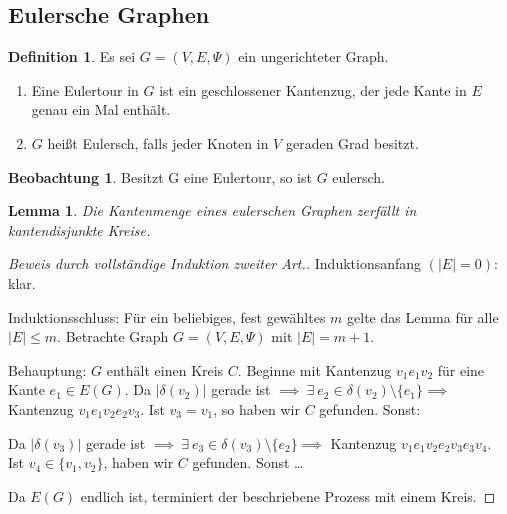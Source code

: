 \documentclass[a4paper,12pt]{article}
\newtheorem{lemma}[axiom]{Lemma}
\theoremstyle{definition}
\newtheorem*{beobachtung}{Beobachtung}
\newtheorem{definition}[axiom]{Definition}
\let\oldexist\exists
\renewcommand{\exists}{\:\oldexist \: }
\begin{document}
	\subsection{Eulersche Graphen}
	\begin{definition}
		Es sei $G = (V, E, \Psi)$ ein ungerichteter Graph.
		\begin{enumerate}[label=(\alph*)]
			\item Eine Eulertour in $G$ ist ein geschlossener Kantenzug, der jede Kante in $E$ genau ein Mal enthält.
			\item $G$ heißt Eulersch, falls jeder Knoten in $V$ geraden Grad besitzt.
		\end{enumerate}
	\end{definition}
	\begin{beobachtung}
		Besitzt G eine Eulertour, so ist $G$ eulersch.
	\end{beobachtung}
	\begin{lemma}
		Die Kantenmenge eines eulerschen Graphen zerfällt in kantendisjunkte Kreise.
	\end{lemma}
	\begin{proof}[Beweis durch vollständige Induktion zweiter Art.]
		Induktionsanfang $(\lvert E\rvert = 0)$: klar.
		
		Induktionsschluss: Für ein beliebiges, fest gewähltes $m$ gelte das Lemma für alle $\lvert E\rvert \leq m$. Betrachte Graph $G = (V, E, \Psi)$ mit $\lvert E\rvert = m + 1$.
		
		Behauptung: $G$ enthält einen Kreis $C$. Beginne mit Kantenzug $v_1e_1v_2$ für eine Kante $e_1 \in E(G)$. Da $\lvert \delta(v_2)\rvert$ gerade ist $\implies\exists e_2 \in \delta(v_2)\setminus\{e_1\} \implies$ Kantenzug $v_1e_1v_2e_2v_3$. Ist $v_3 = v_1$, so haben wir $C$ gefunden. Sonst:
		
		Da $\lvert \delta(v_3)\rvert$ gerade ist $\implies \exists e_3 \in \delta(v_3) \setminus\{e_2\} \implies$ Kantenzug $v_1e_1v_2e_2v_3e_3v_4$. Ist $v_4 \in \{v_1, v_2\}$, haben wir $C$ gefunden. Sonst \dots
		
		Da $E(G)$ endlich ist, terminiert der beschriebene Prozess mit einem Kreis.  
	\end{proof}
\end{document}
